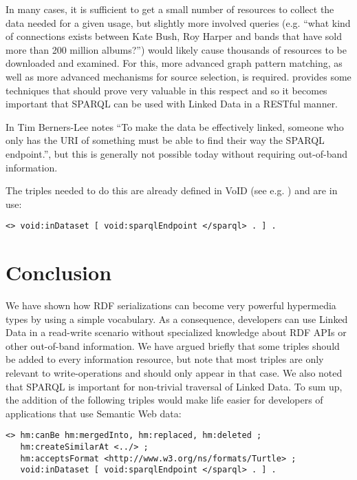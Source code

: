 \documentclass{llncs}
\begin{document}
In many cases, it is sufficient to get a small number of resources to
collect the data needed for a given usage, but slightly more involved
queries (e.g. ``what kind of connections exists between Kate Bush, Roy
Harper and bands that have sold more than 200 million albums?'') would
likely cause thousands of resources to be downloaded and examined. For
this, more advanced graph pattern matching, as well as more advanced
mechanisms for source selection, is
required. \cite{springerlink:10.1007/978-3-642-25073-6-38} provides
some techniques that should prove very valuable in this respect and so
it becomes important that SPARQL can be used with Linked Data in a
RESTful manner.

In \cite{linkeddataissue} Tim Berners-Lee notes ``To make the data be
effectively linked, someone who only has the URI of something must be
able to find their way the SPARQL endpoint.'', but this is generally
not possible today without requiring out-of-band information.

The triples needed to do this are already defined in
VoID (see e.g. \cite{Alexander09describinglinked}) and are in use:
\begin{verbatim}
<> void:inDataset [ void:sparqlEndpoint </sparql> . ] .
\end{verbatim}

\section{Conclusion}

We have shown how RDF serializations can become very powerful
hypermedia types by using a simple vocabulary. As a consequence,
developers can use Linked Data in a read-write scenario without
specialized knowledge about RDF APIs or other out-of-band
information. We have argued briefly that some triples should be added
to every information resource, but note that most triples are only
relevant to write-operations and should only appear in that case. We
also noted that SPARQL is important for non-trivial traversal of
Linked Data. To sum up, the addition of the following triples would
make life easier for developers of applications that use Semantic Web
data:

\begin{verbatim}
<> hm:canBe hm:mergedInto, hm:replaced, hm:deleted ;
   hm:createSimilarAt <../> ;
   hm:acceptsFormat <http://www.w3.org/ns/formats/Turtle> ;
   void:inDataset [ void:sparqlEndpoint </sparql> . ] .
\end{verbatim}


%
%

\end{document}

